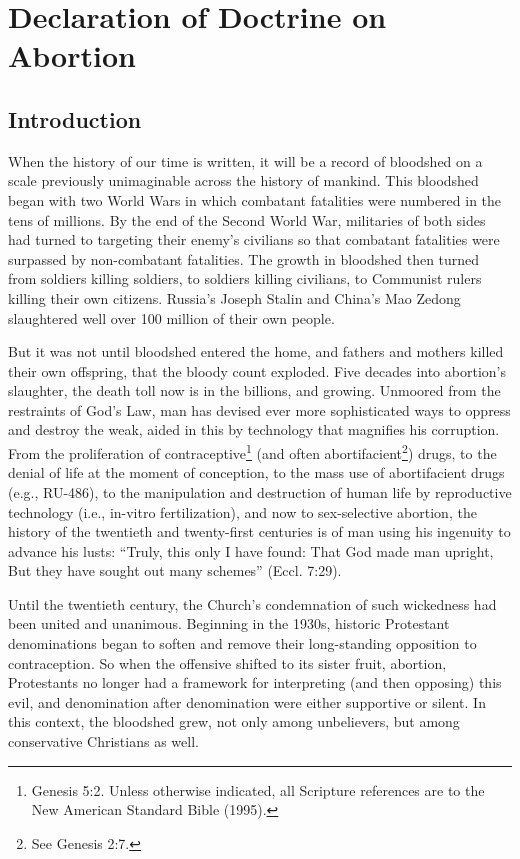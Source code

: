\documentclass[
]{book}
\begin{document}
\hypertarget{declaration-of-doctrine-on-abortion}{%
\chapter*{Declaration of Doctrine on Abortion}\label{declaration-of-doctrine-on-abortion}}

\hypertarget{introduction-1}{%
\section*{Introduction}\label{introduction-1}}

When the history of our time is written, it will be a record of bloodshed on a scale previously unimaginable across the history of mankind. This bloodshed began with two World Wars in which combatant fatalities were numbered in the tens of millions. By the end of the Second World War, militaries of both sides had turned to targeting their enemy's civilians so that combatant fatalities were surpassed by non-combatant fatalities. The growth in bloodshed then turned from soldiers killing soldiers, to soldiers killing civilians, to Communist rulers killing their own citizens. Russia's Joseph Stalin and China's Mao Zedong slaughtered well over 100 million of their own people.

But it was not until bloodshed entered the home, and fathers and mothers killed their own offspring, that the bloody count exploded. Five decades into abortion's slaughter, the death toll now is in the billions, and growing. Unmoored from the restraints of God's Law, man has devised ever more sophisticated ways to oppress and destroy the weak, aided in this by technology that magnifies his corruption. From the proliferation of contraceptive\footnote{Genesis 5:2. Unless otherwise indicated, all Scripture references are to the New American Standard Bible (1995).} (and often abortifacient\footnote{See Genesis 2:7.}) drugs, to the denial of life at the moment of conception, to the mass use of abortifacient drugs (e.g., RU-486), to the manipulation and destruction of human life by reproductive technology (i.e., in-vitro fertilization), and now to sex-selective abortion, the history of the twentieth and twenty-first centuries is of man using his ingenuity to advance his lusts: ``Truly, this only I have found: That God made man upright, But they have sought out many schemes'' (Eccl. 7:29).

Until the twentieth century, the Church's condemnation of such wickedness had been united and unanimous. Beginning in the 1930s, historic Protestant denominations began to soften and remove their long-standing opposition to contraception. So when the offensive shifted to its sister fruit, abortion, Protestants no longer had a framework for interpreting (and then opposing) this evil, and denomination after denomination were either supportive or silent. In this context, the bloodshed grew, not only among unbelievers, but among conservative Christians as well.
\end{document}
